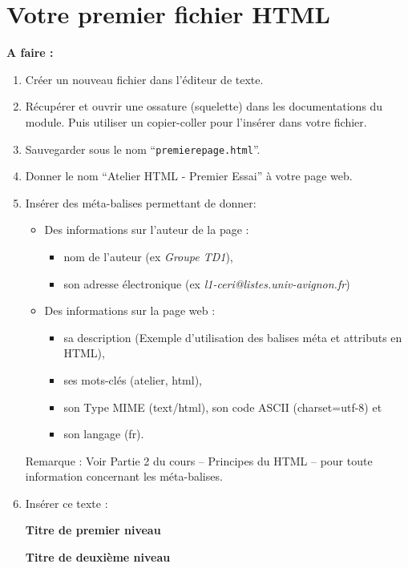 \documentclass[11pt]{article}
\begin{document}
\newpage
\section{Votre premier fichier HTML}

\begin{afaire}
\textbf{A faire :}

\begin{enumerate}
    \item Créer un nouveau fichier dans l'éditeur de texte.
    \item Récupérer et ouvrir une ossature (squelette) dans les documentations du module. Puis utiliser un copier-coller pour l'insérer dans votre fichier.
    \item Sauvegarder sous le nom ``\texttt{premierepage.html}''.
    \item Donner le nom ``Atelier HTML - Premier Essai'' à votre page web.
    \item Insérer des méta-balises permettant de donner:
    \begin{itemize}
        \item Des informations sur l'auteur de la page :
        \begin{itemize}
            \item nom de l'auteur (ex \textit{Groupe TD1}),
            \item son adresse électronique (ex \textit{l1-ceri@listes.univ-avignon.fr})
        \end{itemize}
        \item Des informations sur la page web :
        \begin{itemize}
            \item sa description (Exemple d'utilisation des balises méta et attributs en HTML),
            \item ses mots-clés (atelier, html),
            \item son Type MIME (text/html), son code ASCII (charset=utf-8) et
            \item son langage (fr).
        \end{itemize}
    \end{itemize}
    Remarque : Voir Partie 2 du cours -- Principes du HTML -- pour toute information concernant les méta-balises.
    \item Insérer ce texte :

    \bigskip
    {\LARGE\bfseries Titre de premier niveau}

    {\Large\bfseries Titre de deuxième niveau}


\end{enumerate}
\end{afaire}
\end{document}
